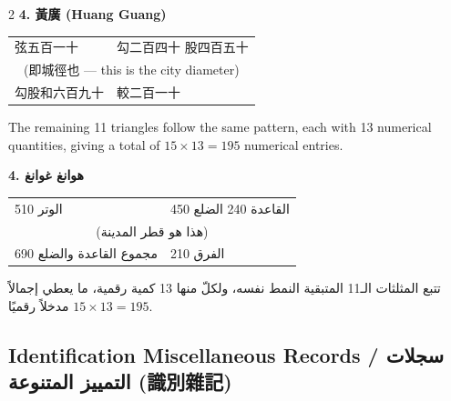 \documentclass[11pt,a4paper]{article}
\newcommand{\ar}[1]{\arabicfont\beginR #1\endR}
\begin{document}
\begin{paracol}{2}
\textbf{4. 黃廣 (Huang Guang)}

\begin{center}
\begin{tabular}{ll}
弦五百一十 & 勾二百四十 \quad 股四百五十 \\
\multicolumn{2}{c}{(即城徑也 --- this is the city diameter)} \\
勾股和六百九十 & 較二百一十 \\
\end{tabular}
\end{center}

\vspace{0.3cm}

The remaining 11 triangles follow the same pattern, each with 13 numerical quantities, giving a total of $15 \times 13 = 195$ numerical entries.

\switchcolumn

\ar{\textbf{4. هوانغ غوانغ}}

\begin{center}
\begin{tabular}{ll}
\ar{الوتر 510} & \ar{القاعدة 240 \quad الضلع 450} \\
\multicolumn{2}{c}{\ar{(هذا هو قطر المدينة)}} \\
\ar{مجموع القاعدة والضلع 690} & \ar{الفرق 210} \\
\end{tabular}
\end{center}

\vspace{0.3cm}

\ar{تتبع المثلثات الـ11 المتبقية النمط نفسه، ولكلّ منها 13 كمية رقمية، ما يعطي إجمالاً $15 \times 13 = 195$ مدخلاً رقميًا.}

\end{paracol}

\newpage


\subsection{Identification Miscellaneous Records / \ar{سجلات التمييز المتنوعة} (識別雜記)}
\label{subsec:identification}
\end{document}
